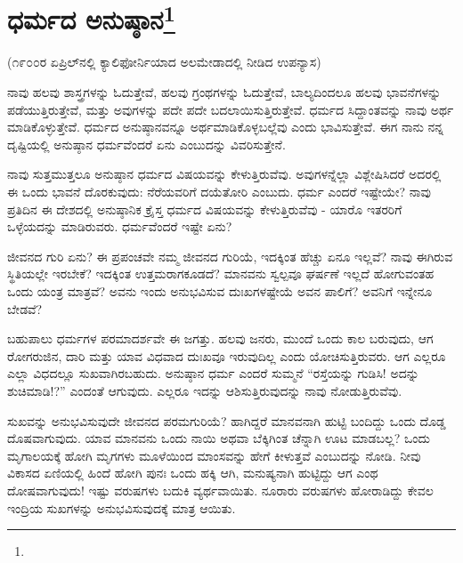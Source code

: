 
\chapter{ಧರ್ಮದ ಅನುಷ್ಠಾನ\protect\footnote{}}

\begin{center}
(೧೯೦೦ರ ಏಪ್ರಿಲ್‌ನಲ್ಲಿ ಕ್ಯಾಲಿಫೋರ್ನಿಯಾದ ಅಲಮೇಡಾದಲ್ಲಿ ನೀಡಿದ ಉಪನ್ಯಾಸ)
\end{center}

ನಾವು ಹಲವು ಶಾಸ್ತ್ರಗಳನ್ನು ಓದುತ್ತೇವೆ, ಹಲವು ಗ್ರಂಥಗಳನ್ನು ಓದುತ್ತೇವೆ, ಬಾಲ್ಯದಿಂದಲೂ ಹಲವು ಭಾವನೆಗಳನ್ನು ಪಡೆಯುತ್ತಿರುತ್ತೇವೆ, ಮತ್ತು ಅವುಗಳನ್ನು ಪದೇ ಪದೇ ಬದಲಾಯಿಸುತ್ತಿರುತ್ತೇವೆ. ಧರ್ಮದ ಸಿದ್ದಾಂತವನ್ನು ನಾವು ಅರ್ಥ ಮಾಡಿಕೊಳ್ಳುತ್ತೇವೆ. ಧರ್ಮದ ಅನುಷ್ಠಾನವನ್ನೂ ಅರ್ಥಮಾಡಿಕೊಳ್ಳಬಲ್ಲೆವು ಎಂದು ಭಾವಿಸುತ್ತೇವೆ. ಈಗ ನಾನು ನನ್ನ ದೃಷ್ಟಿಯಲ್ಲಿ ಅನುಷ್ಠಾನ ಧರ್ಮವೆಂದರೆ ಏನು ಎಂಬುದನ್ನು ವಿವರಿಸುತ್ತೇನೆ.

ನಾವು ಸುತ್ತಮುತ್ತಲೂ ಅನುಷ್ಠಾನ ಧರ್ಮದ ವಿಷಯವನ್ನು ಕೇಳುತ್ತಿರುವೆವು. ಅವುಗಳನ್ನೆಲ್ಲಾ ವಿಶ್ಲೇಷಿಸಿದರೆ ಅದರಲ್ಲಿ ಈ ಒಂದು ಭಾವನೆ ದೊರಕುವುದು: ನೆರೆಯವರಿಗೆ ದಯೆತೋರಿ ಎಂಬುದು. ಧರ್ಮ ಎಂದರೆ ಇಷ್ಟೇಯೇ? ನಾವು ಪ್ರತಿದಿನ ಈ ದೇಶದಲ್ಲಿ ಅನುಷ್ಠಾನಿಕ ಕ್ರೈಸ್ತ ಧರ್ಮದ ವಿಷಯವನ್ನು ಕೇಳುತ್ತಿರುವೆವು - ಯಾರೊ ಇತರರಿಗೆ ಒಳ್ಳೆಯದನ್ನು ಮಾಡಿರುವರು. ಧರ್ಮವೆಂದರೆ ಇಷ್ಟೇ ಏನು?

ಜೀವನದ ಗುರಿ ಏನು? ಈ ಪ್ರಪಂಚವೇ ನಮ್ಮ ಜೀವನದ ಗುರಿಯೆ, ಇದಕ್ಕಿಂತ ಹೆಚ್ಚು ಏನೂ ಇಲ್ಲವೆ? ನಾವು ಈಗಿರುವ ಸ್ಥಿತಿಯಲ್ಲೇ ಇರಬೇಕೆ? ಇದಕ್ಕಿಂತ ಉತ್ತಮರಾಗಕೂಡದೆ? ಮಾನವನು ಸ್ವಲ್ಪವೂ ಘರ್ಷಣೆ ಇಲ್ಲದೆ ಹೋಗುವಂತಹ ಒಂದು ಯಂತ್ರ ಮಾತ್ರವೆ? ಅವನು ಇಂದು ಅನುಭವಿಸುವ ದುಃಖಗಳಷ್ಟೇಯೆ ಅವನ ಪಾಲಿಗೆ? ಅವನಿಗೆ ಇನ್ನೇನೂ ಬೇಡವೆ?

ಬಹುಪಾಲು ಧರ್ಮಗಳ ಪರಮಾದರ್ಶವೇ ಈ ಜಗತ್ತು. ಹಲವು ಜನರು, ಮುಂದೆ ಒಂದು ಕಾಲ ಬರುವುದು, ಆಗ ರೋಗರುಜಿನ, ದಾರಿ ಮತ್ತು ಯಾವ ವಿಧವಾದ ದುಃಖವೂ ಇರುವುದಿಲ್ಲ ಎಂದು ಯೋಚಿಸುತ್ತಿರುವರು. ಆಗ ಎಲ್ಲರೂ ಎಲ್ಲಾ ವಿಧದಲ್ಲೂ ಸುಖವಾಗಿರಬಹುದು. ಅನುಷ್ಠಾನ ಧರ್ಮ ಎಂದರೆ ಸುಮ್ಮನೆ “ರಸ್ತೆಯನ್ನು ಗುಡಿಸಿ! ಅದನ್ನು ಶುಚಿಮಾಡಿ!?” ಎಂದಂತೆ ಆಗುವುದು. ಎಲ್ಲರೂ ಇದನ್ನು ಆಶಿಸುತ್ತಿರುವುದನ್ನು ನಾವು ನೋಡುತ್ತಿರುವೆವು.

ಸುಖವನ್ನು ಅನುಭವಿಸುವುದೇ ಜೀವನದ ಪರಮಗುರಿಯೆ? ಹಾಗಿದ್ದರೆ ಮಾನವನಾಗಿ ಹುಟ್ಟಿ ಬಂದಿದ್ದು ಒಂದು ದೊಡ್ಡ ದೊಷವಾಗುವುದು. ಯಾವ ಮಾನವನು ಒಂದು ನಾಯಿ ಅಥವಾ ಬೆಕ್ಕಿಗಿಂತ ಚೆನ್ನಾಗಿ ಊಟ ಮಾಡಬಲ್ಲ? ಒಂದು ಮೃಗಾಲಯಕ್ಕೆ ಹೋಗಿ ಮೃಗಗಳು ಮೂಳೆಯಿಂದ ಮಾಂಸವನ್ನು ಹೇಗೆ ಕೀಳುತ್ತವೆ ಎಂಬುದನ್ನು ನೋಡಿ. ನೀವು ವಿಕಾಸದ ಏಣಿಯಲ್ಲಿ ಹಿಂದೆ ಹೋಗಿ ಪುನಃ ಒಂದು ಹಕ್ಕಿ ಆಗಿ, ಮನುಷ್ಯನಾಗಿ ಹುಟ್ಟಿದ್ದು ಆಗ ಎಂಥ ದೋಷವಾಗುವುದು! ಇಷ್ಟು ವರುಷಗಳು ಬದುಕಿ ವ್ಯರ್ಥವಾಯಿತು. ನೂರಾರು ವರುಷಗಳು ಹೋರಾಡಿದ್ದು ಕೇವಲ ಇಂದ್ರಿಯ ಸುಖಗಳನ್ನು ಅನುಭವಿಸುವುದಕ್ಕೆ ಮಾತ್ರ ಆಯಿತು.

